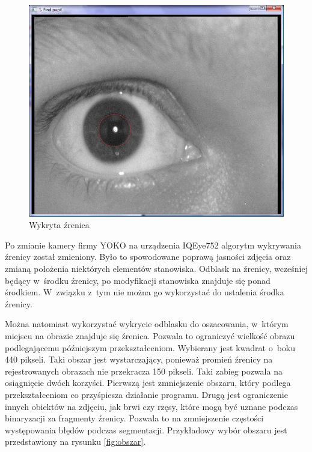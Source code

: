 \begin{figure}
\begin{center}
\includegraphics[scale=0.5]{zrenica.jpg}
\caption{Wykryta źrenica}
\label{fig:zrenicaNasza}
\end{center}
\end{figure}

Po zmianie kamery firmy YOKO na urządzenia IQEye752 algorytm wykrywania źrenicy został zmieniony. Było to spowodowane poprawą jasności zdjęcia oraz zmianą położenia niektórych elementów stanowiska. Odblask na źrenicy, wcześniej będący w~środku źrenicy, po modyfikacji stanowiska znajduje się ponad środkiem. W~związku z~tym nie można go wykorzystać do ustalenia środka źrenicy.

Można natomiast wykorzystać wykrycie odblasku do oszacowania, w~którym miejscu na obrazie znajduje się źrenica. Pozwala to ograniczyć wielkość obrazu podlegającemu późniejszym przekształceniom. Wybierany jest kwadrat o~boku 440 pikseli. Taki obszar jest wystarczający, ponieważ promień źrenicy na rejestrowanych obrazach nie przekracza 150 pikseli. Taki zabieg pozwala na osiągnięcie dwóch korzyści. Pierwszą jest zmniejszenie obszaru, który podlega przekształceniom co przyśpiesza działanie programu. Drugą jest ograniczenie innych obiektów na zdjęciu, jak brwi czy rzęsy, które mogą być uznane podczas binaryzacji za fragmenty źrenicy. Pozwala to na zmniejszenie częstości występowania błędów podczas segmentacji. Przykładowy wybór obszaru jest przedstawiony na rysunku \ref{fig:obszar}.

